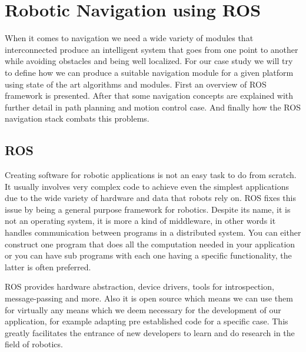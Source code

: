 \chapter{Robotic Navigation using ROS} \label{ch:BaseWork}


When it comes to navigation we need a wide variety of modules that interconnected produce an intelligent system that goes from one point to another while avoiding obstacles and being well localized. For our case study we will try to define how we can produce a suitable navigation module for a given platform using state of the art algorithms and modules. First an overview of \ac{ROS} framework is presented. After that some navigation concepts are explained with further detail in path planning and motion control case. And finally how the \ac{ROS} navigation stack combats this problems.

\section {ROS}
Creating software for robotic applications is not an easy task to do from scratch. It usually involves very complex code to achieve even the simplest applications due to the wide variety of hardware and data that robots rely on. \ac{ROS} \cite{ros} fixes this issue by being a general purpose framework for robotics. Despite its name, it is not an operating system, it is more a kind of middleware, in other words it  handles communication between programs in a distributed system. You can either construct one program that does all the computation needed in your application or you can have sub programs with each one having a specific functionality, the latter is often preferred.

\ac{ROS} provides hardware abstraction, device drivers, tools for introspection, message-passing and more. Also it is open source which means we can use them for virtually any means which we deem necessary for the development of our application, for example adapting pre established code for a specific case. This greatly facilitates the entrance of new developers to learn and do research in the field of robotics.
